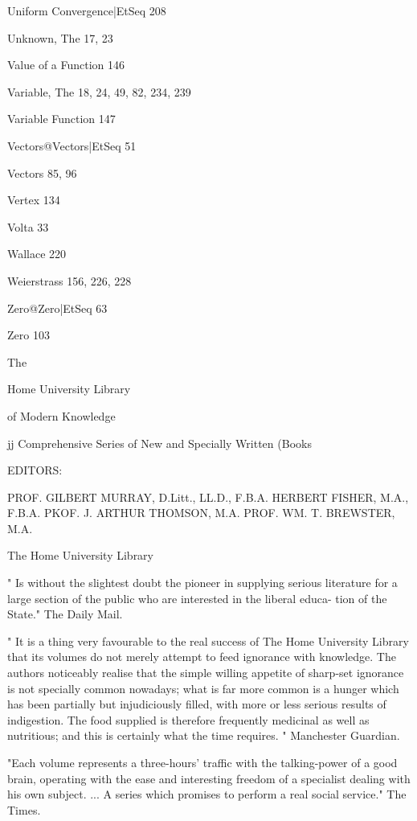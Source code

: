 \documentclass[12pt,leqno]{book}[2005/09/16]
\begin{document}
Uniform Convergence|EtSeq 208

Unknown, The 17, 23

Value of a Function 146

Variable, The 18, 24, 49, 82, 234, 239

Variable Function 147

Vectors@Vectors|EtSeq 51

Vectors 85, 96

Vertex 134

Volta 33

Wallace 220

Weierstrass 156, 226, 228

Zero@Zero|EtSeq 63

Zero 103
\fi

\iffalse

The

Home University
Library



of Modern
Knowledge



jj Comprehensive Series of New
and Specially Written (Books



EDITORS:

PROF. GILBERT MURRAY, D.Litt., LL.D., F.B.A.
HERBERT FISHER, M.A., F.B.A.
PKOF. J. ARTHUR THOMSON, M.A.
PROF. WM. T. BREWSTER, M.A.

The Home University Library

" Is without the slightest doubt the pioneer in supplying serious literature
for a large section of the public who are interested in the liberal educa-
tion of the State." The Daily Mail.

" It is a thing very favourable to the real success of The Home
University Library that its volumes do not merely attempt to feed
ignorance with knowledge. The authors noticeably realise that the
simple willing appetite of sharp-set ignorance is not specially common
nowadays; what is far more common is a hunger which has been
partially but injudiciously filled, with more or less serious results of
indigestion. The food supplied is therefore frequently medicinal as
well as nutritious; and this is certainly what the time requires. "
Manchester Guardian.

"Each volume represents a three-hours' traffic with the talking-power
of a good brain, operating with the ease and interesting freedom of a
specialist dealing with his own subject. ... A series which promises to
perform a real social service." The Times.
\end{document}
